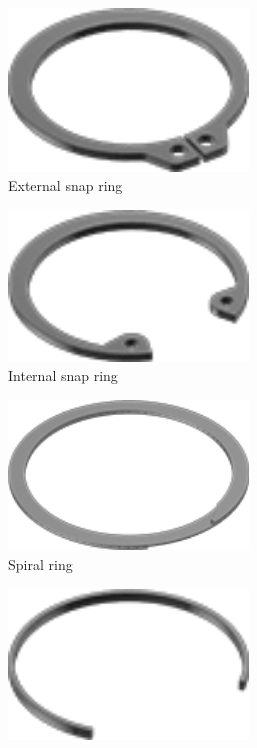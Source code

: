 \documentclass[10pt,letterpaper]{book}
\begin{document}
\begin{figure}[H]
\begin{subfigure}[b]{.24\linewidth}
		\end{subfigure}
		\begin{subfigure}[b]{.24\linewidth}
			\includegraphics[width=0.7\textwidth]{imgs/ext_snapring.png}
			\caption{External snap ring}
		\end{subfigure}
		\begin{subfigure}[b]{.24\linewidth}
			\includegraphics[width=0.7\textwidth]{imgs/int_snapring.png}
			\caption{Internal snap ring}
		\end{subfigure}
		\begin{subfigure}[b]{.24\linewidth}
			\includegraphics[width=0.7\textwidth]{imgs/spiralring.png}
			\caption{Spiral ring}
		\end{subfigure}\begin{subfigure}[b]{.24\linewidth}
			\includegraphics[width=0.7\textwidth]{imgs/circlip.png}

\end{subfigure}
\end{figure}
\end{document}
